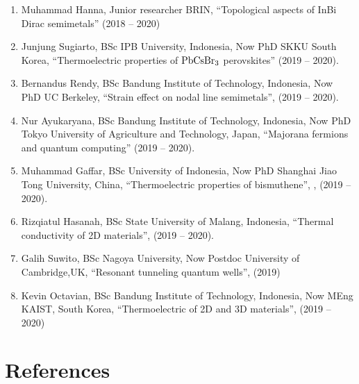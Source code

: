 \begin{enumerate}
\item Muhammad Hanna, Junior researcher BRIN, ``Topological aspects of InBi Dirac semimetals''  (2018 -- 2020)
\item Junjung Sugiarto, BSc IPB University, Indonesia, Now PhD SKKU South Korea,  ``Thermoelectric properties of $\rm PbCsBr_3$ perovskites''  (2019 -- 2020).
\item Bernandus Rendy, BSc Bandung Institute of Technology, Indonesia, Now PhD UC Berkeley, ``Strain effect on nodal line semimetals'',  (2019 -- 2020).
\item Nur Ayukaryana, BSc Bandung Institute of Technology, Indonesia, Now PhD Tokyo University of Agriculture and Technology, Japan, ``Majorana fermions and quantum computing''  (2019 -- 2020).
  \item Muhammad Gaffar,  BSc University of Indonesia, Now PhD Shanghai Jiao Tong University, China, ``Thermoelectric properties of bismuthene'', , (2019 -- 2020).
   \item Rizqiatul Hasanah, BSc State University of Malang, Indonesia, ``Thermal conductivity of 2D materials'',  (2019 -- 2020).
   \item Galih Suwito, BSc Nagoya University, Now Postdoc University of Cambridge,UK, ``Resonant tunneling quantum wells'', (2019)
   \item Kevin Octavian,  BSc Bandung Institute of Technology, Indonesia, Now MEng KAIST, South Korea, ``Thermoelectric of 2D and 3D materials'',  (2019 -- 2020)
\end{enumerate}

\vspace*{\baselineskip}
\section*{References}

